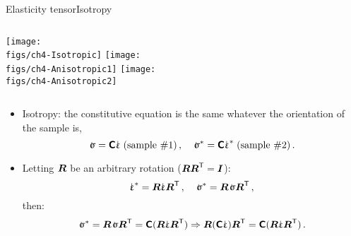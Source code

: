 \begin{frame}{Elasticity tensor}{Isotropy}

\begin{columns}[t]
\centering\texttt{[image: \\figs/ch4-Isotropic]}
\centering\texttt{[image: \\figs/ch4-Anisotropic1]}
\centering\texttt{[image: \\figs/ch4-Anisotropic2]}
\end{columns}
\begin{itemize}
\item Isotropy: the constitutive equation is the same whatever the orientation of the sample is,
\begin{displaymath}
\stress=\tenselas\strain\;(\text{sample \#1})\,,\quad\stress^*=\tenselas\strain^*\;(\text{sample \#2})\,.
\end{displaymath}
\item Letting ${\boldsymbol R}$ be an arbitrary rotation (${\boldsymbol R}{\boldsymbol R}^{\sf T}={\boldsymbol I}$):
\begin{displaymath}
\strain^*=\rotation\strain\rotation^\itr\,,\quad\stress^*=\rotation\stress\rotation^\itr\,,
\end{displaymath}
then:
\begin{displaymath}
\stress^*=\rotation\stress\rotation^\itr=\tenselas(\rotation\strain\rotation^\itr)\imply \rotation(\tenselas\strain)\rotation^\itr=\tenselas(\rotation\strain\rotation^\itr)\,.
\end{displaymath}
\end{itemize}

\end{frame}


